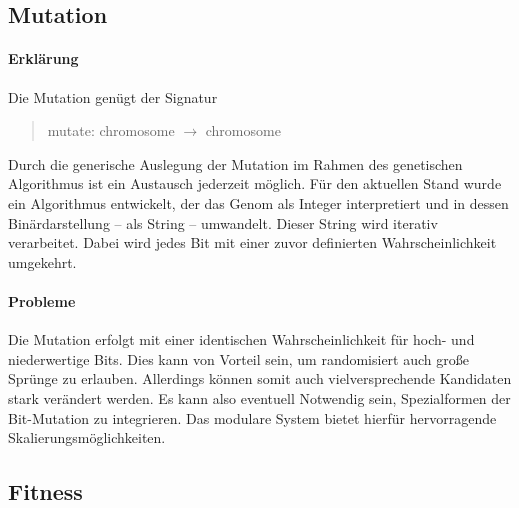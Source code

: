 \documentclass[12pt,a4paper]{scrartcl}
\begin{document}
\subsection{Mutation}
\paragraph{Erklärung}
Die Mutation genügt der Signatur
\begin{quote}
 \textsf{mutate: chromosome $\rightarrow$ chromosome}
\end{quote}
Durch die generische Auslegung der Mutation im Rahmen des genetischen Algorithmus ist ein Austausch jederzeit möglich. Für den aktuellen Stand wurde ein Algorithmus entwickelt, der das Genom als Integer interpretiert und in dessen Binärdarstellung -- als String -- umwandelt. Dieser String wird iterativ verarbeitet. Dabei wird jedes Bit mit einer zuvor definierten Wahrscheinlichkeit umgekehrt.
\paragraph{Probleme} Die Mutation erfolgt mit einer identischen Wahrscheinlichkeit für hoch- und niederwertige Bits. Dies kann von Vorteil sein, um randomisiert auch große Sprünge zu erlauben. Allerdings können somit auch vielversprechende Kandidaten stark verändert werden. Es kann also eventuell Notwendig sein, Spezialformen der Bit-Mutation zu integrieren. Das modulare System bietet hierfür hervorragende Skalierungsmöglichkeiten.

\subsection{Fitness}
\end{document}
